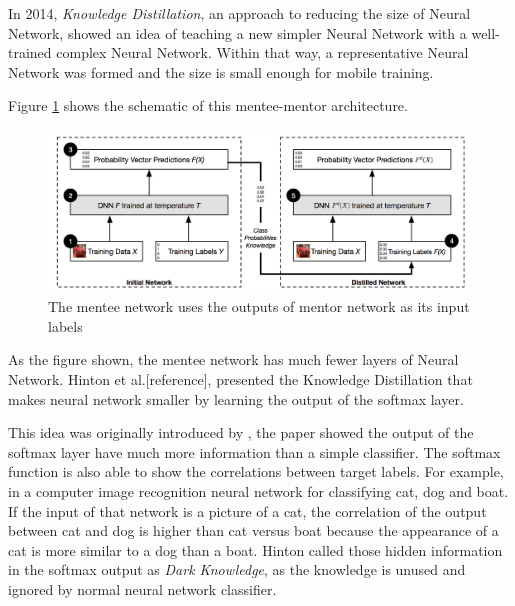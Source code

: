 \documentclass[article]{aaltoseries}
\begin{document}
In 2014, \emph{Knowledge Distillation}, an approach to reducing the size of Neural Network, 
showed an idea of teaching a new simpler Neural Network with a well-trained complex Neural Network.
Within that way, a representative Neural Network was formed and the size is small enough for mobile training.

Figure \ref{fig:mentor_pic}\cite{Distillation:2015} shows the schematic of this mentee-mentor architecture. 

\begin{figure}[t!]
  \begin{center}
    \includegraphics[width=1\textwidth]{figures/mentor_mentee}
    \caption{The mentee network uses the outputs of mentor network as its input labels}
    \label{fig:mentor_pic}
  \end{center}
\end{figure}

As the figure shown, the mentee network has much fewer layers of Neural Network. 
Hinton et al.[reference], presented the Knowledge Distillation that makes neural network smaller by learning the 
output of the softmax layer\cite{SoftMax}. 

This idea was originally introduced by \cite{Caruana2006}, the paper showed 
the output of the softmax layer have much more information than a simple classifier. 
The softmax function is also able to show the correlations between
target labels. For example, in a computer image recognition neural network for classifying cat, dog and boat.
If the input of that network is a picture of a cat, the correlation of the output
between cat and dog is higher than cat versus boat because the appearance of a cat is more similar to a dog than a boat.
Hinton called those hidden information in the softmax output as \emph{Dark Knowledge}, 
as the knowledge is unused and ignored by normal neural network classifier.
\end{document}
